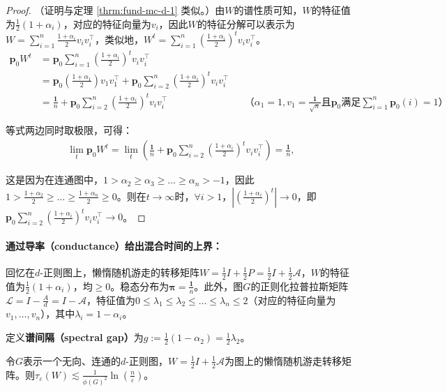 \begin{proof}
    （证明与定理 \ref{thrm:fund-mc-d-1} 类似。）由$W$的谱性质可知，$W$的特征值为$\frac{1}{2}(1+\alpha_i)$，对应的特征向量为$v_i$，因此$W$的特征分解可以表示为$W=\sum_{i=1}^n{\frac{1+\alpha_i}{2}v_iv_i^{\top}}$，类似地，$W^t=\sum_{i=1}^n{\left(\frac{1+\alpha_i}{2}\right)^tv_iv_i^{\top}}$。
    \begin{align*}
        \bm{p}_0W^t&=\bm{p}_0\sum_{i=1}^n{\left(\frac{1+\alpha_i}{2}\right)^tv_iv_i^{\top}}\\
        &=\bm{p}_0\left(\frac{1+\alpha_1}{2}\right)v_1v_1^{\top}+\bm{p}_0\sum_{i=2}^n{\left(\frac{1+\alpha_i}{2}\right)^tv_iv_i^{\top}}\\
        &=\frac{\bm{1}}{n}+\bm{p}_0\sum_{i=2}^n{\left(\frac{1+\alpha_i}{2}\right)^tv_iv_i^{\top}}&&\text{（$\alpha_1=1,v_1=\frac{\bm{1}}{\sqrt{n}}$且$\bm{p}_0$满足$\sum_{i=1}^n\bm{p}_0(i)=1$）}
    \end{align*}

    等式两边同时取极限，可得：
    \begin{align*}
        \lim_t \bm{p}_0W^t =\lim_t \left(\frac{\bm{1}}{n}+\bm{p}_0\sum_{i=2}^n{\left(\frac{1+\alpha_i}{2}\right)^tv_iv_i^{\top}}\right)=\frac{\bm{1}}{n},
    \end{align*}
    
    这是因为在连通图中，$1>\alpha_2\ge \alpha_3\ge \dots\ge \alpha_n>-1$，因此$1> \frac{1+\alpha_2}{2}\ge \dots\ge \frac{1+\alpha_n}{2}\ge 0$。则在$t\to \infty$时，$\forall i>1$，${|\left(\frac{1+\alpha_i}{2}\right)^t|}\to 0$，即$\bm{p}_0\sum_{i=2}^n{\left(\frac{1+\alpha_i}{2}\right)^tv_iv_i^{\top}}\to 0$。
\end{proof}

\paragraph{通过导率（conductance）给出混合时间的上界：}
                
回忆在$d$-正则图上，懒惰随机游走的转移矩阵$W=\frac{1}{2}I+\frac{1}{2}P=\frac{1}{2}I+\frac{1}{2}\mathcal{A}$，$W$的特征值为$\frac{1}{2}(1+\alpha_i)$，均$\ge 0$。稳态分布为$\bm{\pi}=\frac{\bm{1}}{n}$。此外，图$G$的正则化拉普拉斯矩阵$\mathcal{L}=I-\frac{A}{d}=I-\mathcal{A}$，特征值为$0\le\lambda_1\le \lambda_2\le\dots\le \lambda_n\le 2$（对应的特征向量为$v_1,\dots,v_n$），其中$\lambda_i=1-\alpha_i$。

定义\textbf{谱间隔（spectral gap）}为$g:=\frac{1}{2}(1-\alpha_2)=\frac{1}{2}\lambda_2$。

\begin{theorem}
    \label{thrm:mixing-time-d-c}
    令$G$表示一个无向、连通的$d$-正则图，$W=\frac{1}{2}I+\frac{1}{2}\mathcal{A}$为图上的懒惰随机游走转移矩阵。则$\tau_{\varepsilon}(W)\lesssim\frac{1}{\phi(G)^2}\ln{\left(\frac{n}{\varepsilon}\right)}$。
\end{theorem}

